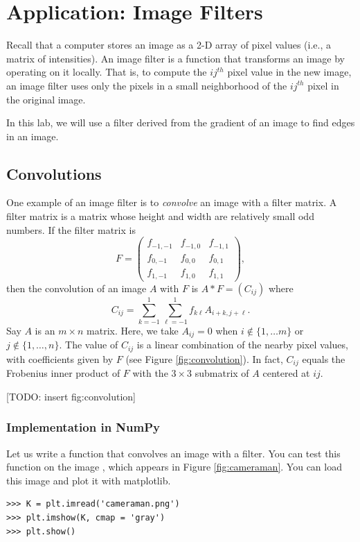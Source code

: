 \section*{Application: Image Filters}
Recall that a computer stores an image as a 2-D array of pixel values (i.e., a matrix of intensities).
An image filter is a function that transforms an image by operating on it locally.
That is, to compute the $ij^{th}$ pixel value in the new image, an image filter uses only the pixels in a small neighborhood of the $ij^{th}$ pixel in the original image.

In this lab, we will use a filter derived from the gradient of an image to find edges in an image.

\subsection*{Convolutions}
One example of an image filter is to \emph{convolve} an image with a filter matrix.
A filter matrix is a matrix whose height and width are relatively small odd numbers.
If the filter matrix is
\[
F = \begin{pmatrix}
f_{-1,-1}&f_{-1,0}&f_{-1,1}\\
f_{0,-1}&f_{0,0}&f_{0,1}\\
f_{1,-1}&f_{1,0}&f_{1,1}
\end{pmatrix},
\]
then the convolution of an image $A$ with $F$ is $A \ast F = (C_{ij})$ where
\begin{equation}\label{equ:convolve}
C_{ij} = \sum_{k=-1}^1 \sum_{\ell=-1}^1 f_{k\ell}A_{i+k,j+\ell}.
\end{equation}
Say $A$ is an $m \times n$ matrix. Here, we take $A_{ij}=0$ when $i \not \in \{1, \ldots m\}$ or $j \not \in \{1, \ldots, n\}$.
The value of $C_{ij}$ is a linear combination of the nearby pixel values, with coefficients given by $F$ (see Figure \ref{fig:convolution}).
In fact, $C_{ij}$ equals the Frobenius inner product of $F$ with the $3 \times 3$ submatrix of $A$ centered at $ij$.

[TODO: insert fig:convolution]

\subsubsection*{Implementation in NumPy}
Let us write a function that convolves an image with a filter. 
You can test this function on the image , which appears in Figure \ref{fig:cameraman}.
You can load this image and plot it with matplotlib.
\begin{lstlisting}
>>> K = plt.imread('cameraman.png')
>>> plt.imshow(K, cmap = 'gray')
>>> plt.show()
\end{lstlisting}

